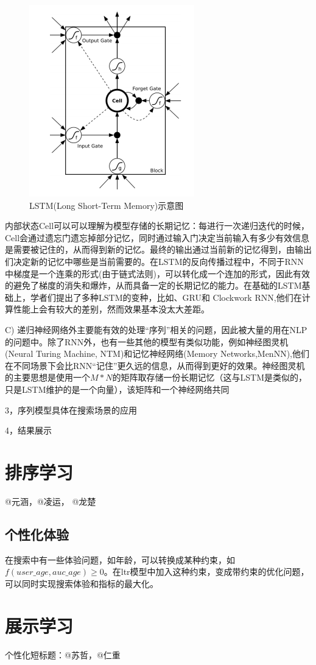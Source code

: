 \begin{figure}[h]
	\centering
	\includegraphics[width=0.3\linewidth]{"fig/LSTM"}
	\caption{LSTM(Long Short-Term Memory)示意图}
	\label{fig:LSTM}
\end{figure}

内部状态Cell可以可以理解为模型存储的长期记忆：每进行一次递归迭代的时候，Cell会通过遗忘门遗忘掉部分记忆，同时通过输入门决定当前输入有多少有效信息是需要被记住的，从而得到新的记忆。最终的输出通过当前新的记忆得到，由输出们决定新的记忆中哪些是当前需要的。在LSTM的反向传播过程中，不同于RNN中梯度是一个连乘的形式(由于链式法则)，可以转化成一个连加的形式，因此有效的避免了梯度的消失和爆炸，从而具备一定的长期记忆的能力。在基础的LSTM基础上，学者们提出了多种LSTM的变种，比如\cite{10}、GRU\cite{11}和 Clockwork RNN\cite{12},他们在计算性能上会有较大的差别，然而效果基本没太大差距\cite{13,14}。

C) 递归神经网络外主要能有效的处理“序列”相关的问题，因此被大量的用在NLP的问题中。除了RNN外，也有一些其他的模型有类似功能，例如神经图灵机(Neural Turing Machine, NTM\cite{7})和记忆神经网络(Memory Networks,MenNN\cite{8,9}),他们在不同场景下会比RNN“记住”更久远的信息，从而得到更好的效果。神经图灵机的主要思想是使用一个$M*N$的矩阵取存储一份长期记忆（这与LSTM是类似的，只是LSTM维护的是一个向量），该矩阵和一个神经网络共同

3，序列模型具体在搜索场景的应用

4，结果展示

	
\section{排序学习}
	@元涵，@凌运， @龙楚
	\subsection{个性化体验}
	在搜索中有一些体验问题，如年龄，可以转换成某种约束，如$f(user\_age,auc\_age)\geq0$。在ltr模型中加入这种约束，变成带约束的优化问题，可以同时实现搜索体验和指标的最大化。
	

\section{展示学习}
	个性化短标题：@苏哲，@仁重 

